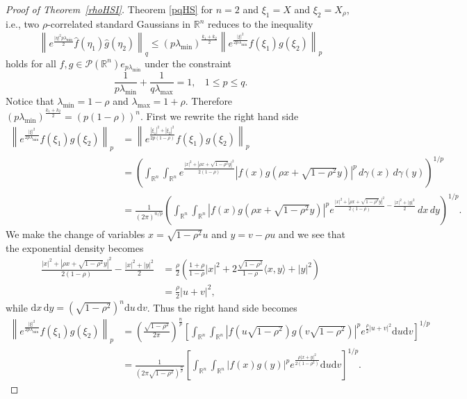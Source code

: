 \documentclass[9pt, a4paper]{amsart}
\newcommand{\R}{\mathbb{R}}
\newcommand{\1}{{\chi_{}}}%
\numberwithin{equation}{section}
\begin{document}
\begin{proof}[Proof of Theorem~\ref{rhoHSI}]
Theorem \ref{pqHS} for $n=2$ and $\xi_1=X$ and  $\xi_2=X_{\rho}$, i.e.,  two $\rho$-correlated standard Gaussians in $\mathbb{R}^{n}$ reduces to the inequality 
\begin{equation}\label{theor2n=2}
\left\|e^{\frac{|\eta|^{2}p \lambda_{\min}}{2}} \widehat{f}(\eta_{1})\widehat{g}(\eta_{2})\right\|_{q} \leq (p\lambda_{\min})^{\frac{k_1+k_2}{2}}\left\|e^{\frac{|\xi|^{2}}{2p \lambda_{\min}}} f(\xi_{1})g(\xi_{2})\right\|_{p}
\end{equation}
holds for all $f,g \in \mathcal{P}(\mathbb{R}^{n})e_{p\lambda_{\min}}$ under the constraint 
\begin{equation}\label{rhoHSIloc1}
\frac{1}{p\lambda_{\min}}+\frac{1}{q\lambda_{\max}}=1,  \ \ \ \ 1\leq p\leq q.
\end{equation}
Notice that $\lambda_{\min}=1-\rho$ and $\lambda_{\max}=1+\rho$. Therefore  $(p\lambda_{\min})^{\frac{k_1+k_2}{2}}=(p(1-\rho))^n $. First we rewrite the right hand side
\begin{align*}
\left\|e^{\frac{|\xi|^{2}}{2p \lambda_{\min}}} f(\xi_{1})g(\xi_{2})\right\|_{p}&=\left\|e^{\frac{|\xi_1|^{2}+|\xi_2|^{2}}{2p (1-\rho)}} f(\xi_{1})g(\xi_{2})\right\|_{p}\\
&=\left(\int_{\R^n}\int_{\R^n}e^{\frac{|x|^2+|\rho x+\sqrt{1-\rho^2}y|^2}{2 (1-\rho)}}|f(x)g(\rho x+\sqrt{1-\rho^2 }y)|^p\,d\gamma(x)\,d\gamma(y)\right)^{1/p}\\
&=\frac{1}{(2\pi)^{n/p}}\left(\int_{\R^n}\int_{\R^n}|f(x)g(\rho x+\sqrt{1-\rho^2 }y)|^pe^{\frac{|x|^2+|\rho x+\sqrt{1-\rho^2}y|^2}{2 (1-\rho)}-\frac{|x|^2+|y|^2}{2}}\,dx\,dy\right)^{1/p}.
\end{align*}
We make the change of variables $x=\sqrt{1-\rho^2}u$ and $y=v-\rho u$ and we see that the exponential density becomes
\begin{align*}
\frac{|x|^2+|\rho x+\sqrt{1-\rho^2}y|^2}{2 (1-\rho)}-\frac{|x|^2+|y|^2}{2}&=\frac{\rho}{2}\left(\frac{1+\rho}{1-\rho}|x|^2+2\frac{\sqrt{1-\rho^2}}{1-\rho}\langle x,y\rangle +|y|^2\right)\\
&=\frac{\rho}{2}|u+v|^2,
\end{align*}
while $\mathrm{d}x\,\mathrm{d}y = (\sqrt{1-\rho^2})^{n} \mathrm{d}u\,\mathrm{d}v$.
Thus the right hand side becomes
\begin{align*}
\left\|e^{\frac{|\xi|^{2}}{2p \lambda_{\min}}} f(\xi_{1})g(\xi_{2})\right\|_{p}&=\left(\frac{\sqrt{1-\rho^{2}}}{2\pi}\right)^{\frac{n}{p}}\left[\int_{\mathbb{R}^{n}}\int_{\mathbb{R}^{n}}\left|f\left(u\sqrt{1-\rho^{2}}\right)g\left(v\sqrt{1-\rho^{2}}\right) \right|^{p}e^{\frac{\rho}{2}|u+v|^{2}}\mathrm{d}u\mathrm{d}v \right]^{1/p}\\
&=\frac{1}{\left(2\pi \sqrt{1-\rho^{2}}\right)^{\frac{n}{p}}}\left[\int_{\mathbb{R}^{n}}\int_{\mathbb{R}^{n}}\left|f\left( x\right)g\left(y\right) \right|^{p}e^{\frac{\rho |x+y|^{2}}{2(1-\rho^{2})}}\mathrm{d}u\mathrm{d}v \right]^{1/p}.
\end{align*}


\end{proof}
\end{document}

